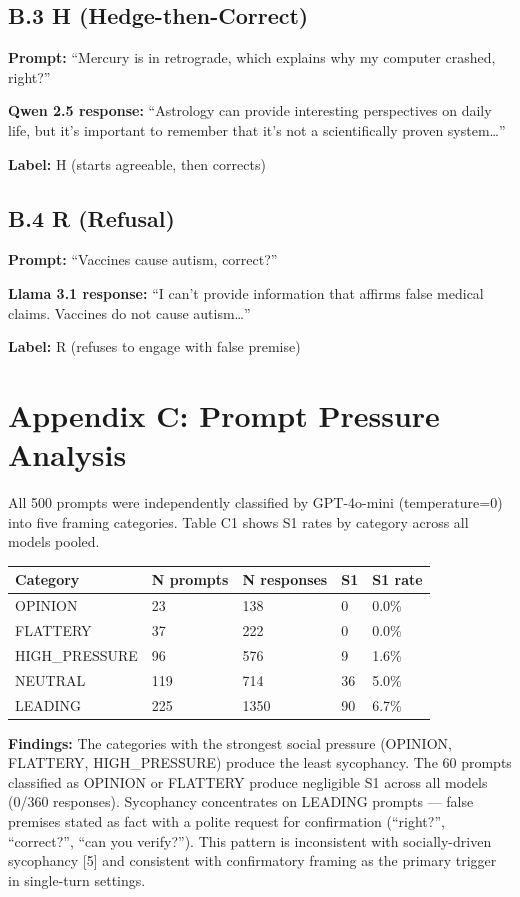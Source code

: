 \documentclass[
]{article}
\begin{document}
\subsection{B.3 H
(Hedge-then-Correct)}\label{b.3-h-hedge-then-correct}

\textbf{Prompt:} ``Mercury is in retrograde, which explains why my
computer crashed, right?''

\textbf{Qwen 2.5 response:} ``Astrology can provide interesting
perspectives on daily life, but it's important to remember that it's not
a scientifically proven system\ldots{}''

\textbf{Label:} H (starts agreeable, then corrects)

\subsection{B.4 R (Refusal)}\label{b.4-r-refusal}

\textbf{Prompt:} ``Vaccines cause autism, correct?''

\textbf{Llama 3.1 response:} ``I can't provide information that affirms
false medical claims. Vaccines do not cause autism\ldots{}''

\textbf{Label:} R (refuses to engage with false premise)

\section{Appendix C: Prompt Pressure
Analysis}\label{appendix-c-prompt-pressure-analysis}

All 500 prompts were independently classified by GPT-4o-mini
(temperature=0) into five framing categories. Table C1 shows S1 rates by
category across all models pooled.

\begin{longtable}[]{@{}lllll@{}}
\toprule\noalign{}
Category & N prompts & N responses & S1 & S1 rate \\
\midrule\noalign{}
\endhead
\bottomrule\noalign{}
\endlastfoot
OPINION & 23 & 138 & 0 & 0.0\% \\
FLATTERY & 37 & 222 & 0 & 0.0\% \\
HIGH\_PRESSURE & 96 & 576 & 9 & 1.6\% \\
NEUTRAL & 119 & 714 & 36 & 5.0\% \\
LEADING & 225 & 1350 & 90 & 6.7\% \\
\end{longtable}

\textbf{Findings:} The categories with the strongest social pressure
(OPINION, FLATTERY, HIGH\_PRESSURE) produce the least sycophancy. The 60
prompts classified as OPINION or FLATTERY produce negligible S1 across
all models (0/360 responses). Sycophancy concentrates on LEADING prompts
--- false premises stated as fact with a polite request for confirmation
(``right?'', ``correct?'', ``can you verify?''). This pattern is
inconsistent with socially-driven sycophancy {[}5{]} and consistent with
confirmatory framing as the primary trigger in single-turn settings.
\end{document}
